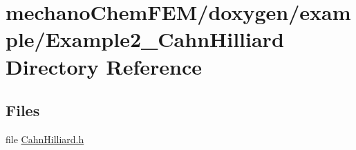 \section{mechano\+Chem\+F\+E\+M/doxygen/example/\+Example2\+\_\+\+Cahn\+Hilliard Directory Reference}
\label{dir_6ba90621a44649e75629bb6c83d85235}
\subsection*{Files}
\begin{DoxyCompactItemize}
\item 
file \mbox{\hyperlink{_cahn_hilliard_8h}{Cahn\+Hilliard.\+h}}
\end{DoxyCompactItemize}
